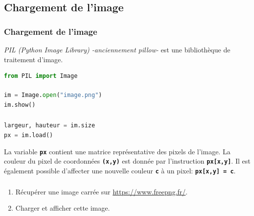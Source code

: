 \documentclass[svgnames,11pt]{beamer}
\begin{document}
\subsection{Chargement de l'image}
\begin{frame}[fragile]
    \frametitle{Chargement de l'image}

    \emph{PIL (Python Image Library) -anciennement pillow-} est une bibliothèque de traitement d'image. 
\begin{center}
\begin{lstlisting}[language=Python , basicstyle=\ttfamily\small, xleftmargin=2em, xrightmargin=2em]
from PIL import Image

im = Image.open("image.png")
im.show()
\end{lstlisting}
\label{CODE}
\end{center}  

\end{frame}
\begin{frame}[fragile]
    \frametitle{}

\begin{center}
\begin{lstlisting}[language=Python , basicstyle=\ttfamily\small, xleftmargin=2em, xrightmargin=2em]
largeur, hauteur = im.size
px = im.load()
\end{lstlisting}
\label{CODE}
\end{center}
\begin{aretenir}[Information]
    La variable \textbf{\texttt{px}} contient une matrice représentative des pixels de l'image. La couleur du pixel de coordonnées \textbf{\texttt{(x,y)}} est donnée par l'instruction \texttt{\textbf{px[x,y]}}. Il est également possible d'affecter une nouvelle couleur \textbf{\texttt{c}} à un pixel: \texttt{\textbf{px[x,y] = c}}.
\end{aretenir}
\end{frame}
\begin{frame}
    \frametitle{}

    \begin{activite}
        \begin{enumerate}
            \item Récupérer une image carrée sur \url{https://www.freepng.fr/}.
            \item Charger et afficher cette image.
        \end{enumerate}
        \end{activite}

\end{frame}
\end{document}
